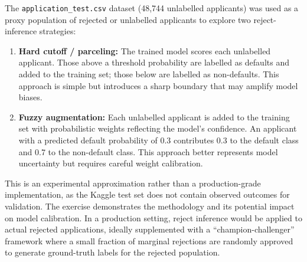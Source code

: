 The \texttt{application\_test.csv} dataset (48,744 unlabelled applicants) was used as a proxy population of rejected or unlabelled applicants to explore two reject-inference strategies:

\begin{enumerate}
    \item \textbf{Hard cutoff / parceling:} The trained model scores each unlabelled applicant. Those above a threshold probability are labelled as defaults and added to the training set; those below are labelled as non-defaults. This approach is simple but introduces a sharp boundary that may amplify model biases.

    \item \textbf{Fuzzy augmentation:} Each unlabelled applicant is added to the training set with probabilistic weights reflecting the model's confidence. An applicant with a predicted default probability of 0.3 contributes 0.3 to the default class and 0.7 to the non-default class. This approach better represents model uncertainty but requires careful weight calibration.
\end{enumerate}

This is an experimental approximation rather than a production-grade implementation, as the Kaggle test set does not contain observed outcomes for validation. The exercise demonstrates the methodology and its potential impact on model calibration. In a production setting, reject inference would be applied to actual rejected applications, ideally supplemented with a ``champion-challenger'' framework where a small fraction of marginal rejections are randomly approved to generate ground-truth labels for the rejected population.
